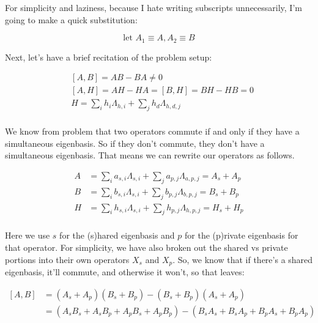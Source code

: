 \begin{answer}

  \begin{answerpart}{\ctrois{}}
    For simplicity and laziness, because I hate writing subscripts
    unnecessarily, I'm going to make a quick substitution:

    \begin{equation}
      \text{let }A_1 \equiv A, A_2 \equiv B
    \end{equation}

    Next, let's have a brief recitation of the problem setup:
    
    \begin{equation}
      \begin{split}
        &[A, B] = AB - BA \ne 0\\
        &[A, H] = AH - HA = [B, H] = BH - HB = 0\\
        &H = \sum_i h_i\Lambda_{h,i} + \sum_j h_d\Lambda_{h,d,j}\\
      \end{split}
    \end{equation}

    We know from problem  that two
    operators commute if and only if they have a simultaneous
    eigenbasis.  So if they don't commute, they don't have a
    simultaneous eigenbasis.  That means we can rewrite our operators
    as follows.

    \begin{equation}
      \begin{split}
        A &= \sum_i a_{s,i}\Lambda_{s,i} + \sum_j a_{p,j}\Lambda_{a,p,j}
        = A_s + A_p\\
        B &= \sum_i b_{s,i}\Lambda_{s,i} + \sum_j b_{p,j}\Lambda_{b,p,j}
        = B_s + B_p\\
        H &= \sum_i h_{s,i}\Lambda_{s,i} + \sum_j h_{p,j}\Lambda_{h,p,j}
        = H_s + H_p\\
      \end{split}
    \end{equation}

    Here we use $s$ for the (s)hared eigenbasis and $p$ for the
    (p)rivate eigenbasis for that operator.  For simplicity, we have
    also broken out the shared vs private portions into their own
    operators $X_s$ and $X_p$.  So, we know that if there's a shared
    eigenbasis, it'll commute, and otherwise it won't, so that leaves:

    \begin{equation}
      \begin{split}
        [A, B]
        &= (A_s + A_p)(B_s + B_p) - (B_s + B_p)(A_s + A_p)\\
        &= (A_sB_s + A_sB_p + A_pB_s + A_pB_p)
        - (B_sA_s + B_sA_p + B_pA_s + B_pA_p)\\
      \end{split}
    \end{equation}


\end{answerpart}
\end{answer}
